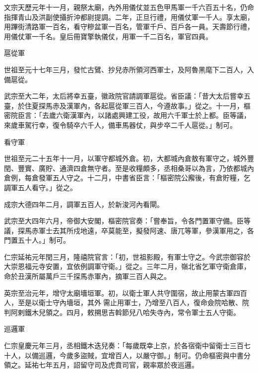 \begin{pinyinscope}
 文宗天歷元年十一月，親祭太廟，內外用儀仗並五色甲馬軍一千六百五十名，仍命指揮青山及洪副使攝折沖都尉提調。二年，正旦行禮，用儀仗軍一千人。享太廟，用蹕街清路軍一百名，看守糝盆軍一百名，管軍千戶、百戶各一員。天壽節行禮，用儀仗軍一千名。皇后冊寶擎執儀仗，用軍一千二百名，軍官四員。



 扈從軍



 世祖至元十七年三月，發忙古鷿、抄兒赤所領河西軍士，及阿魯黑麾下二百人，入備扈從。



 武宗至大二年，太后將幸五臺，徽政院官請調軍扈從。省臣議：「昔大太后嘗幸五臺，於住夏探馬赤及漢軍內，各起扈從軍三百人，今遵故事。」從之。十一月，樞密院臣言：「去歲六衛漢軍內，以諸處興建工役，故用六千軍士於上都。臣等議，來歲車駕行幸，復令騎卒六千人，備車馬器仗，與步卒二千人扈從。」制可。



 看守軍



 世祖至元二十五年十一月，以軍守都城外倉。初，大都城內倉敖有軍守之，城外豐閏、豐實、廣貯、通濟四倉無守者。至是收糧頗多，丞相桑哥以為言，乃依都城內倉例，每倉發軍五人守之。十二月，中書省臣言：「樞密院公廨後，有倉貯糧，乞調軍五人看守。」從之。



 成宗大德四年二月，調軍五百人，於新浚河內看閘。



 武宗至大四年六月，帝御大安閣，樞密院官奏：「嘗奉旨，令各門置軍守備。臣等議，探馬赤軍士去其所戍地遠，卒莫能至，擬發阿速、唐兀等軍，參漢軍用之，各門置五十人。」制可。



 仁宗延祐元年閏三月，隆禧院官言：「初，世祖影殿，有軍士守之。今武宗御容於大崇恩福元寺安置，宜依例調軍守衛。」從之。三年二月，嶺北省乞軍守衛倉庫，命於丑漢所屬萬戶三千探馬赤軍內，摘軍三百人與之。



 英宗至治元年，增守太廟墻垣軍。初，以衛士軍人共守圍宿，故止用蒙古軍四百人，至是以衛士守內墻垣，其外需止用軍士，乃增至八百人，復命僉院哈散、院判阿剌鐵木兒領之。四月，敕搠思吉斡節兒八哈失寺內，常令軍士五人守衛。



 巡邏軍



 仁宗皇慶元年三月，丞相鐵木迭兒奏：「每歲既幸上京，於各宿衛中留衛士三百七十人，以備巡邏，今歲多盜賊，宜增百人，以嚴守御。」制可。仍命樞密與中書分領之。延祐七年五月，詔留守司及虎賁司官，親率眾於夜巡邏。




\end{pinyinscope}
